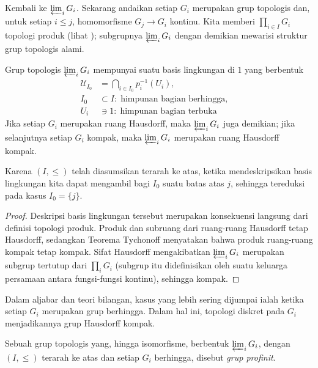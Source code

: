 Kembali ke $\varprojlim_i G_i$. Sekarang andaikan setiap $G_i$ merupakan grup topologis dan, untuk setiap $i \leq j$, homomorfisme $G_j \to G_i$ kontinu. Kita memberi $\prod_{i \in I} G_i$ topologi produk (lihat \cite[\S 3.3]{Xiong}); subgrupnya $\varprojlim_i G_i$ dengan demikian mewarisi struktur grup topologis alami.
\begin{lemma}\label{prop:completion-compactness}
	Grup topologis $\varprojlim_i G_i$ mempunyai suatu basis lingkungan di $1$ yang berbentuk
	\[ \begin{aligned} \mathcal{U}_{I_0} &= \bigcap_{i \in I_0} p_i^{-1}(U_i), \qquad\\ I_0 &\subset I: \; \text{himpunan bagian berhingga}, \quad\\ U_i &\ni 1: \; \text{himpunan bagian terbuka} \end{aligned} \]
	Jika setiap $G_i$ merupakan ruang Hausdorff, maka $\varprojlim_i G_i$ juga demikian; jika selanjutnya setiap $G_i$ kompak, maka $\varprojlim_i G_i$ merupakan ruang Hausdorff kompak.
\end{lemma}
Karena $(I, \leq)$ telah diasumsikan terarah ke atas, ketika mendeskripsikan basis lingkungan kita dapat mengambil bagi $I_0$ suatu batas atas $j$, sehingga tereduksi pada kasus $I_0 = \{j\}$.
\begin{proof}
	Deskripsi basis lingkungan tersebut merupakan konsekuensi langsung dari definisi topologi produk. Produk dan subruang dari ruang-ruang Hausdorff tetap Hausdorff, sedangkan Teorema Tychonoff \cite[Teorema 7.7.2]{Xiong} menyatakan bahwa produk ruang-ruang kompak tetap kompak. Sifat Hausdorff mengakibatkan $\varprojlim_i G_i$ merupakan subgrup tertutup dari $\prod_i G_i$ (subgrup itu didefinisikan oleh suatu keluarga persamaan antara fungsi-fungsi kontinu), sehingga kompak.
\end{proof}

Dalam aljabar dan teori bilangan, kasus yang lebih sering dijumpai ialah ketika setiap $G_i$ merupakan grup berhingga. Dalam hal ini, topologi diskret pada $G_i$ menjadikannya grup Hausdorff kompak.
\begin{definition}\label{def:profinite-group}
	Sebuah grup topologis yang, hingga isomorfisme, berbentuk $\varprojlim_i G_i$, dengan $(I, \leq)$ terarah ke atas dan setiap $G_i$ berhingga, disebut \emph{grup profinit}.
\end{definition}

